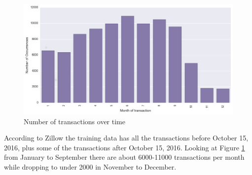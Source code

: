 \documentclass[a4paper]{article}
\begin{document}
\begin{figure}
\centering
\includegraphics[width=1\textwidth]{./img/train-transactiondate.png}
\caption{\label{fig:transactions}Number of transactions over time}
\end{figure}
According to Zillow the training data has all the transactions before October 15, 2016, plus some of the transactions after October 15, 2016. Looking at Figure \ref{fig:transactions} from January to September there are about 6000-11000 transactions per month while dropping to under 2000 in November to December.
\end{document}
